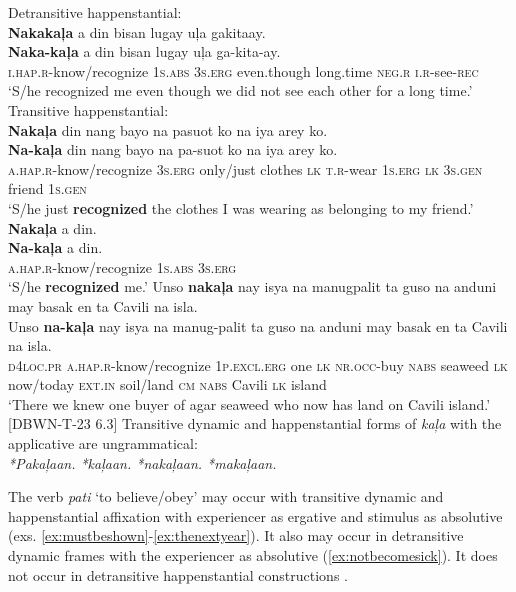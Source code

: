 \ea
Detransitive happenstantial: \\
\textbf{Nakakaļa}  a  din  bisan  lugay  uļa  gakitaay. \\\smallskip
\gll \textbf{Naka-kaļa}  a  din  bisan  lugay  uļa  ga-kita-ay. \\
\textsc{i.hap.r}-know/recognize  1\textsc{s.abs}  3\textsc{s.erg}  even.though  long.time  \textsc{neg.r}  \textsc{i.r}-see-\textsc{rec} \\
\glt ‘S/he recognized me even though we did not see each other for a long time.’
\z
\ea
Transitive happenstantial: \\
\textbf{Nakaļa}  din  nang  bayo  na  pasuot  ko  na  iya arey  ko. \\\smallskip
\gll \textbf{Na-kaļa}  din  nang  bayo  na  pa-suot  ko  na  iya arey  ko. \\
\textsc{a.hap.r}-know/recognize  3\textsc{s.erg}  only/just  clothes  \textsc{lk}  \textsc{t.r}-wear  1\textsc{s.erg}  \textsc{lk}  3\textsc{s.gen}
friend 1\textsc{s.gen} \\
\glt `S/he just \textbf{recognized} the clothes I was wearing as belonging to my friend.’
\z
\ea
\textbf{Nakaļa}  a  din. \\\smallskip
\gll \textbf{Na-kaļa}  a  din. \\
\textsc{a.hap.r}-know/recognize  1\textsc{s.abs}  3\textsc{s.erg} \\
\glt ‘S/he \textbf{recognized} me.’
\z
\ea
Unso  \textbf{nakaļa}  nay  isya  na  manugpalit ta  guso  na  anduni  may  basak  en  ta  Cavili  na  isla. \\\smallskip
\gll Unso  \textbf{na-kaļa}  nay  isya  na  manug-palit ta  guso  na  anduni  may  basak  en  ta  Cavili  na  isla. \\
\textsc{d4loc.pr}  \textsc{a.hap.r}-know/recognize  1\textsc{p.excl.erg}  one  \textsc{lk}  \textsc{nr.occ}-buy
\textsc{nabs}  seaweed  \textsc{lk}  now/today  \textsc{ext.in}  soil/land  \textsc{cm}  \textsc{nabs}  Cavili   \textsc{lk}  island \\
\glt `There we knew one buyer of agar seaweed who now has land on Cavili island.’ [DBWN-T-23 6.3]
\z
\ea
Transitive dynamic and happenstantial forms of \textit{kaļa} with the applicative are ungrammatical: \\
\textit{*Pakaļaan. *kaļaan. *nakaļaan. *makaļaan.}
\z

The verb \textit{pati} ‘to believe/obey’ may occur with transitive dynamic and happenstantial affixation with experiencer as ergative and stimulus as absolutive (exs. \ref{ex:mustbeshown}-\ref{ex:thenextyear}). It also may occur in detransitive dynamic frames with the experiencer as absolutive (\ref{ex:notbecomesick}). It does not occur in detransitive happenstantial constructions .

